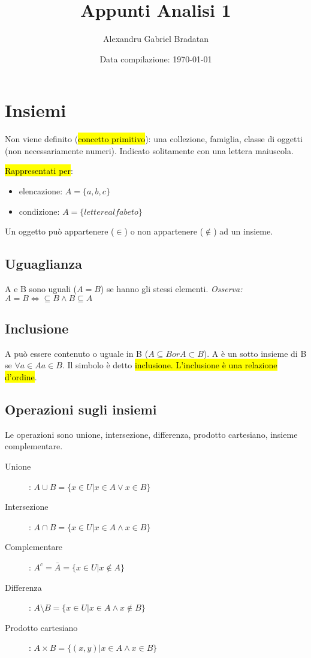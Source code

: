 \documentclass[a4paper,12pt,oneside]{article}
\title{Appunti Analisi 1}
\author{Alexandru Gabriel Bradatan}
\date{Data compilazione: \today}
\begin{document}
\maketitle

\section{Insiemi}
Non viene definito (\hl{concetto primitivo}): una collezione, famiglia,
classe di oggetti (non necessariamente numeri). Indicato solitamente con una
lettera maiuscola.

\hl{Rappresentati per}:
\begin{itemize}
    \item elencazione: \(A = \{a, b, c\}\)
    \item condizione: \(A = \{lettere alfabeto\}\)
\end{itemize}

Un oggetto può appartenere ($\in$) o non appartenere ($\notin$) ad un insieme.

\subsection{Uguaglianza}
A e B sono uguali ($A = B$) se hanno gli stessi elementi.
\textit{Osserva: $A = B \iff \subseteq B \wedge B \subseteq A$}

\subsection{Inclusione}
A può essere contenuto o uguale in B ($A \subseteq B or A \subset B$).
A è un sotto insieme di B se $\forall a \in A a \in B$. Il simbolo è detto
\hl{inclusione. L'inclusione è una relazione d'ordine}.

\subsection{Operazioni sugli insiemi}
Le operazioni sono unione, intersezione, differenza, prodotto cartesiano,
insieme complementare.

\begin{description}
    \item[Unione]: $A \cup B = \{ x \in U | x \in A \vee x \in B \}$
    \item[Intersezione]: $A \cap B = \{ x \in U | x \in A \wedge x \in B \}$
    \item[Complementare]: $A^c = \bar{A} = \{ x \in U | x \notin A \}$
    \item[Differenza]: $A \setminus B = \{ x \in U | x \in A \wedge x \notin B \}$
    \item[Prodotto cartesiano]: $A \times B = \{ (x,y) | x \in A \wedge x \in B \}$
\end{description}
\end{document}
